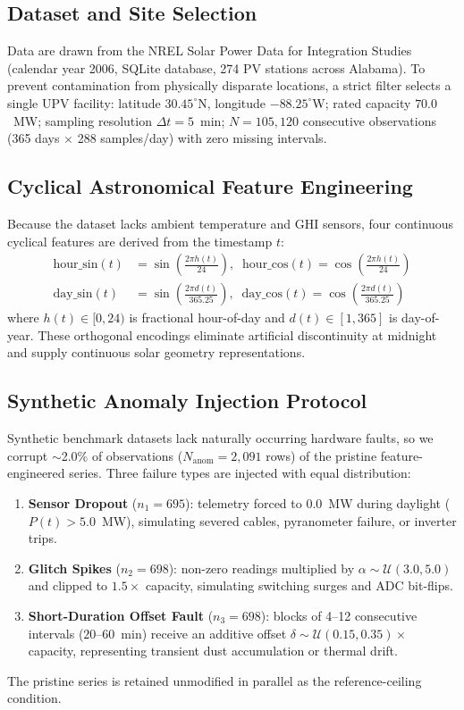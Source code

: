 \documentclass[conference]{IEEEtran}
\begin{document}
\subsection{Dataset and Site Selection}
Data are drawn from the NREL Solar Power Data for Integration Studies (calendar year 2006, SQLite database, 274 PV stations across Alabama). To prevent contamination from physically disparate locations, a strict filter selects a single UPV facility: latitude $30.45^\circ$N, longitude $-88.25^\circ$W; rated capacity $70.0$~MW; sampling resolution $\Delta t = 5$~min; $N = 105{,}120$ consecutive observations (365 days $\times$ 288 samples/day) with zero missing intervals.

\subsection{Cyclical Astronomical Feature Engineering}
Because the dataset lacks ambient temperature and GHI sensors, four continuous cyclical features are derived from the timestamp $t$:
\begin{align}
\text{hour\_sin}(t) &= \sin\!\left(\frac{2\pi h(t)}{24}\right), \;\;
\text{hour\_cos}(t) = \cos\!\left(\frac{2\pi h(t)}{24}\right) \\
\text{day\_sin}(t) &= \sin\!\left(\frac{2\pi d(t)}{365.25}\right), \;\;
\text{day\_cos}(t) = \cos\!\left(\frac{2\pi d(t)}{365.25}\right)
\end{align}
where $h(t) \in [0, 24)$ is fractional hour-of-day and $d(t) \in [1, 365]$ is day-of-year. These orthogonal encodings eliminate artificial discontinuity at midnight and supply continuous solar geometry representations.

\subsection{Synthetic Anomaly Injection Protocol}
Synthetic benchmark datasets lack naturally occurring hardware faults, so we corrupt $\sim$2.0\% of observations ($N_{\text{anom}} = 2{,}091$ rows) of the pristine feature-engineered series. Three failure types are injected with equal distribution:
\begin{enumerate}
    \item \textbf{Sensor Dropout} ($n_1 = 695$): telemetry forced to $0.0$~MW during daylight ($P(t) > 5.0$~MW), simulating severed cables, pyranometer failure, or inverter trips.
    \item \textbf{Glitch Spikes} ($n_2 = 698$): non-zero readings multiplied by $\alpha \sim \mathcal{U}(3.0, 5.0)$ and clipped to $1.5 \times$ capacity, simulating switching surges and ADC bit-flips.
    \item \textbf{Short-Duration Offset Fault} ($n_3 = 698$): blocks of 4--12 consecutive intervals ($20$--$60$~min) receive an additive offset $\delta \sim \mathcal{U}(0.15, 0.35) \times$ capacity, representing transient dust accumulation or thermal drift.
\end{enumerate}
The pristine series is retained unmodified in parallel as the reference-ceiling condition.
\end{document}
